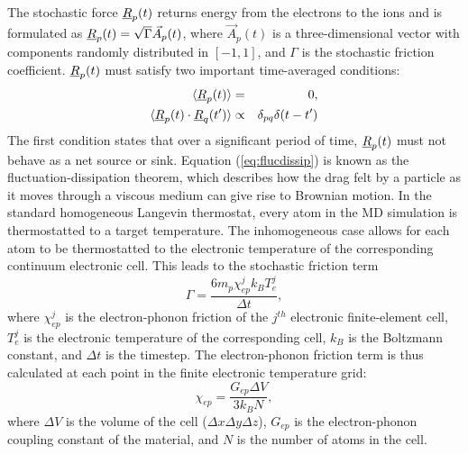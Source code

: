 The stochastic force $\mbox{$\underline{R}$}_{p}(t)$ returns energy from the
electrons to the ions and is formulated as
$\mbox{$\underline{R}$}_{p}(t) = \sqrt{\Gamma} \vec{A}_{p}(t)$, where $\vec{A}_{p}(t)$
is a three-dimensional vector with components randomly distributed
in $[-1,1]$, and $\Gamma$ is the stochastic friction coefficient.
$\mbox{$\underline{R}$}_{p}(t)$ must satisfy two important time-averaged conditions:
\begin{eqnarray}
\langle \mbox{$\underline{R}$}_{p}(t) \rangle &=& 0, \\
\langle \mbox{$\underline{R}$}_{p}(t) \cdot \mbox{$\underline{R}$}_{q}(t^{\prime}) \rangle &\propto& \delta_{pq} \delta (t-t^{\prime}) \label{eq:flucdissip}
\end{eqnarray}
The first condition states that over a significant period of time,
$\mbox{$\underline{R}$}_{p}(t)$ must not behave as a net source or sink. Equation
(\ref{eq:flucdissip}) is known as the fluctuation-dissipation theorem,
which describes how the drag felt by a particle as it moves through
a viscous medium can give rise to Brownian motion. In the standard
homogeneous Langevin thermostat, every atom in the MD simulation
is thermostatted to a target temperature. The inhomogeneous case
allows for each atom to be thermostatted to the electronic temperature
of the corresponding continuum electronic cell. This leads to the
stochastic friction term
\begin{equation}
\Gamma = \frac{6 m_{p} \chi_{ep}^j k_B T_e^j}{\Delta t},
\end{equation}
where $\chi_{ep}^j$ is the electron-phonon friction of the $j^{th}$
electronic finite-element cell, $T_e^j$ is the electronic temperature
of the corresponding cell, $k_B$ is the Boltzmann constant, and
$\Delta t$ is the timestep. The electron-phonon friction term is thus
calculated at each point in the finite electronic temperature grid:
\begin{equation} \label{eq:chiep}
\chi_{ep} = \frac{G_{ep} \Delta V}{3 k_B N},
\end{equation}
where $\Delta V$ is the volume of the cell ($\Delta x \Delta y \Delta z$),
$G_{ep}$ is the electron-phonon coupling constant of the material, and
$N$ is the number of atoms in the cell.

